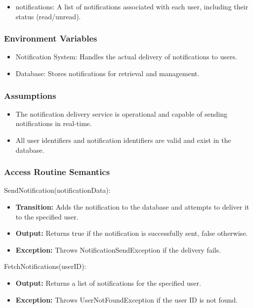 \documentclass[12pt, titlepage]{article}
\begin{document}
\begin{itemize}
    \item notifications: A list of notifications associated with each user, including their status (read/unread).
\end{itemize}

\subsubsection{Environment Variables}

\begin{itemize}
    \item Notification System: Handles the actual delivery of notifications to users.
    \item Database: Stores notifications for retrieval and management.
\end{itemize}

\subsubsection{Assumptions}

\begin{itemize}
    \item The notification delivery service is operational and capable of sending notifications in real-time.
    \item All user identifiers and notification identifiers are valid and exist in the database.
\end{itemize}

\subsubsection{Access Routine Semantics}

\noindent SendNotification(notificationData):
\begin{itemize}
    \item \textbf{Transition:} Adds the notification to the database and attempts to deliver it to the specified user.
    \item \textbf{Output:} Returns true if the notification is successfully sent, false otherwise.
    \item \textbf{Exception:} Throws NotificationSendException if the delivery fails.
\end{itemize}

\noindent FetchNotifications(userID):
\begin{itemize}
    \item \textbf{Output:} Returns a list of notifications for the specified user.
    \item \textbf{Exception:} Throws UserNotFoundException if the user ID is not found.
\end{itemize}
\end{document}
